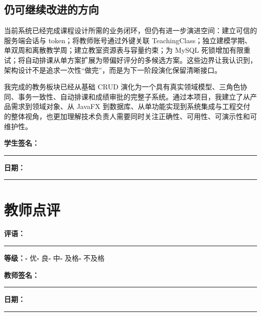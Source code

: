 \documentclass[UTF8,11pt,a4paper]{ctexart}
\begin{document}
\subsection{仍可继续改进的方向}

当前系统已经完成课程设计所需的业务闭环，但仍有进一步演进空间：建立可信的服务端会话与 token；将教师账号通过外键关联 TeachingClass；独立建模学期、单双周和离散教学周；建立教室资源表与容量约束；为 MySQL 死锁增加有限重试；将自动排课从单方案扩展为带偏好评分的多候选方案。这些边界让我认识到，架构设计不是追求一次性“做完”，而是为下一阶段演化保留清晰接口。

\clearpage
\begin{keybox}[title={\bfseries 个人总结}]
我完成的教务板块已经从基础 CRUD 演化为一个具有真实领域模型、三角色协同、事务一致性、自动排课和成绩审批的完整子系统。通过本项目，我建立了从产品需求到领域对象、从 JavaFX 到数据库、从单功能实现到系统集成与工程交付的整体视角，也更加理解技术负责人需要同时关注正确性、可用性、可演示性和可维护性。
\end{keybox}

\vspace{1.2cm}
\begin{flushright}
  \textbf{学生签名：}\rule{5.0cm}{0.5pt}\qquad
  \textbf{日期：}\rule{3.2cm}{0.5pt}
\end{flushright}

\vfill
\section*{教师点评}
\begin{summarybox}
\vspace{0.4cm}
\textbf{评语：}\par
\vspace{3.0cm}
\hrule
\vspace{0.7cm}
\textbf{等级：}\quad $\square$ 优\qquad $\square$ 良\qquad $\square$ 中\qquad $\square$ 及格\qquad $\square$ 不及格
\vspace{0.7cm}

\hfill \textbf{教师签名：}\rule{4.2cm}{0.5pt}\qquad
\textbf{日期：}\rule{3.0cm}{0.5pt}
\end{summarybox}
\end{document}
